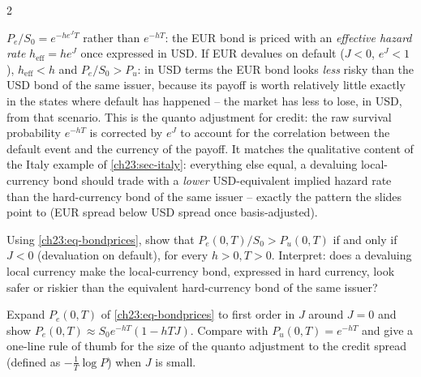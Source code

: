 \begin{paracol}{2}
\begin{intuition}[Reading $P_e$]
$P_e/S_0=e^{-h e^JT}$ rather than $e^{-hT}$: the EUR bond is priced with an \emph{effective hazard rate}
$h_{\mathrm{eff}}=he^J$ once expressed in USD. If EUR devalues on default ($J<0$, $e^J<1$), $h_{\mathrm{eff}}<h$
and $P_e/S_0>P_u$: in USD terms the EUR bond looks \emph{less} risky than the USD bond of the same issuer, because
its payoff is worth relatively little exactly in the states where default has happened -- the market has less to
lose, in USD, from that scenario. This is the quanto adjustment for credit: the raw survival probability $e^{-hT}$
is corrected by $e^J$ to account for the correlation between the default event and the currency of the payoff. It
matches the qualitative content of the Italy example of \cref{ch23:sec-italy}: everything else equal, a devaluing
local-currency bond should trade with a \emph{lower} USD-equivalent implied hazard rate than the hard-currency
bond of the same issuer -- exactly the pattern the slides point to (EUR spread below USD spread once basis-adjusted).
\end{intuition}

\begin{exercise}\label{ch23:ex-sign}
Using \cref{ch23:eq-bondprices}, show that $P_e(0,T)/S_0>P_u(0,T)$ if and only if $J<0$ (devaluation on default),
for every $h>0,T>0$. Interpret: does a devaluing local currency make the local-currency bond, expressed in hard
currency, look safer or riskier than the equivalent hard-currency bond of the same issuer?
\end{exercise}

\begin{exercise}\label{ch23:ex-small}
Expand $P_e(0,T)$ of \cref{ch23:eq-bondprices} to first order in $J$ around $J=0$ and show
$P_e(0,T)\approx S_0e^{-hT}(1-hTJ)$. Compare with $P_u(0,T)=e^{-hT}$ and give a one-line rule of thumb for the
size of the quanto adjustment to the credit spread (defined as $-\tfrac1T\log P$) when $J$ is small.
\end{exercise}


\end{paracol}
